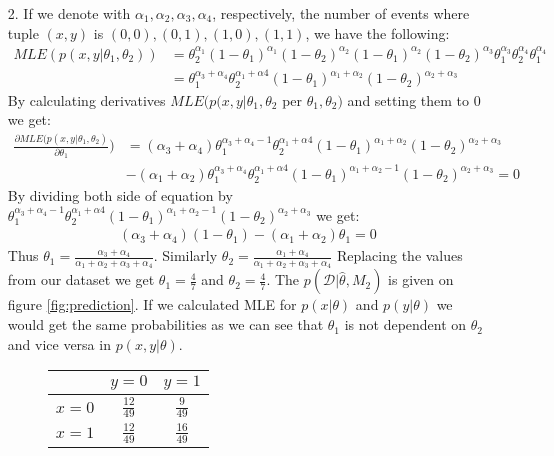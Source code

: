 \documentclass[10pt,a4paper]{article}
\begin{document}
\begin{enumerate}
\begin{enumerate}
\item[2.]
If we denote with $\alpha_1, \alpha_2, \alpha_3, \alpha_4$, respectively, the number of events where tuple $(x, y)$ is $(0, 0), (0, 1), (1, 0), (1, 1)$, we have the following:
\begin{align*}
MLE(p(x, y|\theta_1, \theta_2)) &= \theta_2^{\alpha_1}(1-\theta_1)^{\alpha_1}(1-\theta_2)^{\alpha_2}(1-\theta_1)^{\alpha_2}(1-\theta_2)^{\alpha_3}\theta_1^{\alpha_3}\theta_2^{\alpha_4}\theta_1^{\alpha_4} \nonumber \\
&= \theta_1^{\alpha_3 + \alpha_4}\theta_2^{\alpha_1+\alpha4}
(1-\theta_1)^{\alpha_1 + \alpha_2}(1-\theta_2)^{\alpha_2 + \alpha_3}
\end{align*}
By calculating derivatives $MLE(p(x, y|\theta_1, \theta_2$ per $\theta_1, \theta_2)$ and setting them to 0 we get:
\begin{align*}
\frac{\partial MLE(p(x, y|\theta_1, \theta_2)}{\partial \theta_1})&= (\alpha_3+\alpha_4)\theta_1^{\alpha_3+\alpha_4 -1}\theta_2^{\alpha_1+\alpha4}
(1-\theta_1)^{\alpha_1 + \alpha_2}(1-\theta_2)^{\alpha_2 + \alpha_3}\\
&- (\alpha_1+\alpha_2)\theta_1^{\alpha_3+\alpha_4}\theta_2^{\alpha_1+\alpha4}
(1-\theta_1)^{\alpha_1 + \alpha_2-1}(1-\theta_2)^{\alpha_2 + \alpha_3}=0
\end{align*}
By dividing both side of equation by $\theta_1^{\alpha_3+\alpha_4-1}\theta_2^{\alpha_1+\alpha4}
(1-\theta_1)^{\alpha_1 + \alpha_2-1}(1-\theta_2)^{\alpha_2 + \alpha_3}$ we get:
\begin{align*}
(\alpha_3+\alpha_4)(1-\theta_1)- (\alpha_1 + \alpha_2)\theta_1 = 0
\end{align*}
Thus $\theta_1 = \frac{\alpha_3+\alpha_4}{\alpha_1+\alpha_2 + \alpha_3+\alpha_4}$. Similarly $\theta_2 = \frac{\alpha_1+\alpha_4}{\alpha_1+\alpha_2 + \alpha_3+\alpha_4}$
Replacing the values from our dataset we get $\theta_1 = \frac{4}{7}$ and $\theta_2=\frac{4}{7}$. The $p(\mathcal{D}|\hat{\theta},M_2)$ is given on figure
\ref{fig:prediction}. If we calculated MLE for $p(x|\theta)$ and $p(y|\theta)$ we would get the same probabilities as we can see that $\theta_1$ is not dependent on $\theta_2$ and vice versa in $p(x, y|\theta)$.
\begin{figure}[htb!]
\begin{center}
\begin{tabular}{c|cc}
 & $y=0$ & $y=1$ \\ 
\hline 
$x=0$ & $\frac{12}{49}$ & $\frac{9}{49}$ \\ 
$x=1$ & $\frac{12}{49}$ & $\frac{16}{49}$ \\ 

\end{tabular}
\end{center}
\end{figure}
\end{enumerate}
\end{enumerate}
\end{document}
